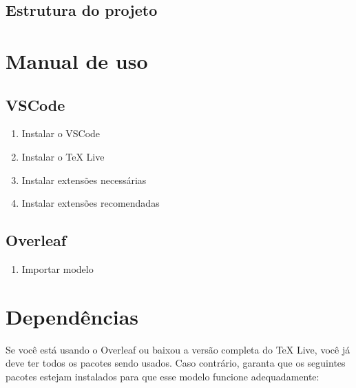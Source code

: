 \documentclass[twoside, 11pt]{article}
\begin{document}
\subsection{Estrutura do projeto}


\section{Manual de uso}

\subsection{VSCode}

\begin{enumerate}
    \item Instalar o VSCode
    \item Instalar o TeX Live
    \item Instalar extensões necessárias
    \item Instalar extensões recomendadas
\end{enumerate}

\subsection{Overleaf}

\begin{enumerate}
    \item Importar modelo
\end{enumerate}

\section{Dependências}

Se você está usando o Overleaf ou baixou a versão completa do TeX Live, 
você já deve ter todos os pacotes sendo usados. Caso contrário, garanta que os seguintes 
pacotes estejam instalados para que esse modelo funcione adequadamente:
\end{document}

